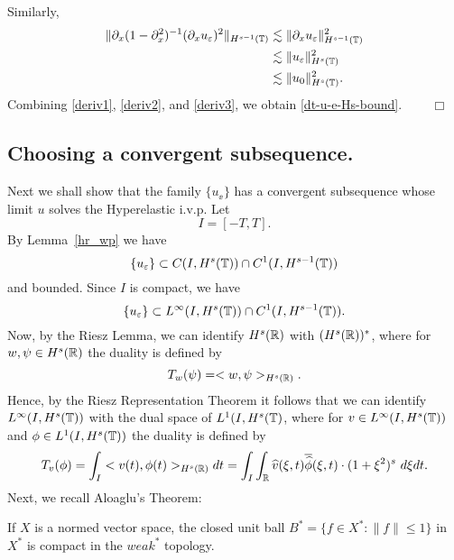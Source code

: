 Similarly,
\begin{equation}
\begin{split}
\label{deriv3}
\|\partial_x (1-\partial_x^2)^{-1} (\partial_x u_\varepsilon)^2\|_{H^{s-1}(\mathbb{T})}
& \lesssim \|\partial_x u_\varepsilon\|^2_{H^{s-1}(\mathbb{T})} 
\\
& \lesssim  \|u_\varepsilon \|^2_{H^s(\mathbb{T})}
\\
& \lesssim \|u_0\|^2_{H^s(\mathbb{T})}.
\end{split}
\end{equation}
Combining \eqref{deriv1}, \eqref{deriv2}, and \eqref{deriv3}, we
obtain \eqref{dt-u-e-Hs-bound}. $\qquad \Box$
%
%
\subsection{Choosing  a convergent subsequence.}
%
Next we shall show that  the family $\{ u_\ee\}$ has a convergent subsequence
whose limit $u$ solves the Hyperelastic i.v.p. 
Let
$$
I= [-T, T].
$$
By Lemma~\ref{hr_wp} we have 
%
\begin{equation}
\label{C-1-fam}
\{u_\varepsilon\}\subset C(I, H^s(\mathbb{T}))\cap C^1(I, H^{s-1}(\mathbb{T}))
\end{equation}
%
and bounded. Since $I$ is compact, we have  
%
\begin{equation}
\label{Lip-1-fam}
\{u_\varepsilon\}\subset L^{\infty}(I, H^s(\mathbb{T}))\cap C^1(I,
H^{s-1}(\mathbb{T})).
\end{equation}
%
Now, by the Riesz Lemma, we can identify $H^s(\mathbb{R})$ with
$(H^s(\mathbb{R}))^*$, where for $w, \psi \in H^s(\mathbb{R})$ the duality is
defined by 
\begin{equation*}
T_w(\psi) = <w, \psi>_{H^s(\mathbb{R})}.
\end{equation*}
Hence, by the Riesz Representation Theorem it follows that we can
identify \\ $L^\infty(I, H^s(\mathbb{T})) $ with the dual space of $L^1(I,
H^{s}(\mathbb{T})$, where for $v\in L^\infty(I, H^s(\mathbb{T})) $ and $ \phi \in
L^1(I, H^{s}(\mathbb{T}))$ the duality is defined by  
%
\begin{equation}
T_v(\phi) = \int_I <v (t), \phi (t)>_{H^s(\mathbb{R})} dt  = \int_I
\int_{\mathbb{R}}
\widehat{v}(\xi, t) \overline{\widehat{\phi}}(\xi, t) \cdot (1
+ \xi^2)^s \ d \xi dt.
\end{equation}
%
Next, we recall Aloaglu's Theorem:
\begin{theorem}
If $X$ is a normed vector space,
the closed unit ball $B^* = \{f \in X^* : \|f\| \le
1\}$ in $X^*$ is compact in the $weak^*$ topology.
\end{theorem}
